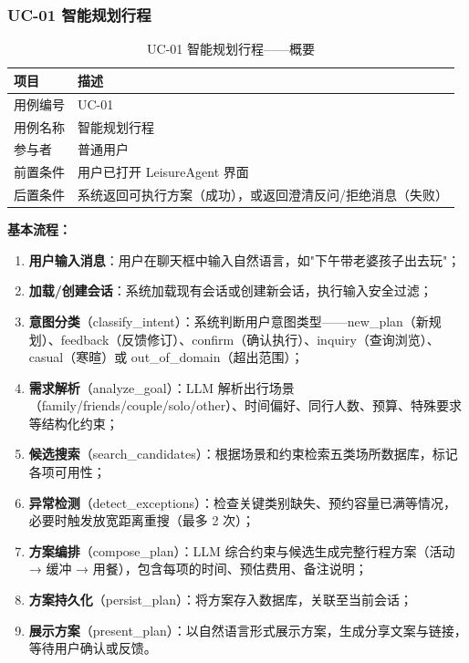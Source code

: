 \documentclass[12pt,a4paper]{ctexart}
\begin{document}
\newpage

\subsubsection{UC-01 智能规划行程}

\begin{table}[ht]
\centering
\begin{tabular}{p{3cm}p{10cm}}
\toprule
\textbf{项目} & \textbf{描述} \\
\midrule
用例编号   & UC-01 \\
用例名称   & 智能规划行程 \\
参与者     & 普通用户 \\
前置条件   & 用户已打开 LeisureAgent 界面 \\
后置条件   & 系统返回可执行方案（成功），或返回澄清反问/拒绝消息（失败） \\
\bottomrule
\end{tabular}
\caption{UC-01 智能规划行程——概要}
\label{tab:uc01}
\end{table}

\textbf{基本流程：}

\begin{enumerate}[label=\textbf{步骤 \arabic*:}]
  \item \textbf{用户输入消息}：用户在聊天框中输入自然语言，如"下午带老婆孩子出去玩"；
  \item \textbf{加载/创建会话}：系统加载现有会话或创建新会话，执行输入安全过滤；
  \item \textbf{意图分类}（classify\_intent）：系统判断用户意图类型——new\_plan（新规划）、feedback（反馈修订）、confirm（确认执行）、inquiry（查询浏览）、casual（寒暄）或 out\_of\_domain（超出范围）；
  \item \textbf{需求解析}（analyze\_goal）：LLM 解析出行场景（family/friends/couple/solo/other）、时间偏好、同行人数、预算、特殊要求等结构化约束；
  \item \textbf{候选搜索}（search\_candidates）：根据场景和约束检索五类场所数据库，标记各项可用性；
  \item \textbf{异常检测}（detect\_exceptions）：检查关键类别缺失、预约容量已满等情况，必要时触发放宽距离重搜（最多 2 次）；
  \item \textbf{方案编排}（compose\_plan）：LLM 综合约束与候选生成完整行程方案（活动 → 缓冲 → 用餐），包含每项的时间、预估费用、备注说明；
  \item \textbf{方案持久化}（persist\_plan）：将方案存入数据库，关联至当前会话；
  \item \textbf{展示方案}（present\_plan）：以自然语言形式展示方案，生成分享文案与链接，等待用户确认或反馈。
\end{enumerate}
\end{document}
